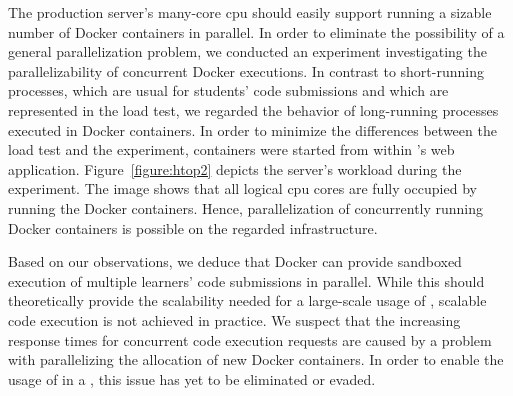 The production server's many-core \gls{cpu} should easily support running a sizable number of Docker containers in parallel. In order to eliminate the possibility of a general parallelization problem, we conducted an experiment investigating the parallelizability of concurrent Docker executions. In contrast to short-running processes, which are usual for students' code submissions and which are represented in the load test, we regarded the behavior of long-running processes executed in Docker containers. In order to minimize the differences between the load test and the experiment, containers were started from within \tool's web application. Figure~\ref{figure:htop2} depicts the server's workload during the experiment. The image shows that all logical \gls{cpu} cores are fully occupied by running the Docker containers. Hence, parallelization of concurrently running Docker containers is possible on the regarded infrastructure.

Based on our observations, we deduce that Docker can provide sandboxed execution of multiple learners' code submissions in parallel. While this should theoretically provide the scalability needed for a large-scale usage of \tool, scalable code execution is not achieved in practice. We suspect that the increasing response times for concurrent code execution requests are caused by a problem with parallelizing the allocation of new Docker containers. In order to enable the usage of \tool in a \mooc, this issue has yet to be eliminated or evaded.
